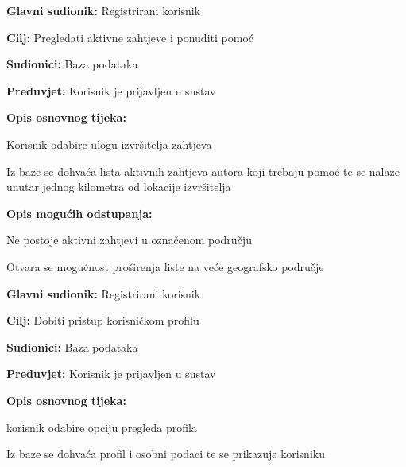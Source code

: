 \noindent {}
\begin{packed_item}
	\item \textbf{Glavni sudionik: }Registrirani korisnik
	\item  \textbf{Cilj:} Pregledati aktivne zahtjeve i ponuditi pomoć
	\item  \textbf{Sudionici:} Baza podataka
	\item  \textbf{Preduvjet:} Korisnik je prijavljen u sustav
	\item  \textbf{Opis osnovnog tijeka:}
	\item[] \begin{packed_enum}
		\item Korisnik odabire ulogu izvršitelja zahtjeva
		\item Iz baze se dohvaća lista aktivnih zahtjeva autora koji trebaju pomoć te se nalaze unutar jednog kilometra od lokacije izvršitelja
	\end{packed_enum}
	\item  \textbf{Opis mogućih odstupanja:}
	\item[] \begin{packed_item}
		\item[2.a] Ne postoje aktivni zahtjevi u označenom području
		\item[] \begin{packed_enum}
			\item Otvara se mogućnost proširenja liste na veće geografsko područje
		\end{packed_enum}
	\end{packed_item}
\end{packed_item}

\noindent {}
\begin{packed_item}
	
	\item \textbf{Glavni sudionik: } Registrirani korisnik
	\item  \textbf{Cilj:} Dobiti pristup korisničkom profilu
	\item  \textbf{Sudionici:} Baza podataka
	\item  \textbf{Preduvjet:} Korisnik je prijavljen u sustav
	\item  \textbf{Opis osnovnog tijeka:}
	
	\item[] \begin{packed_enum}
		
		\item korisnik odabire opciju pregleda profila
		\item Iz baze se dohvaća profil i osobni podaci te se prikazuje korisniku
	\end{packed_enum}
\end{packed_item}

